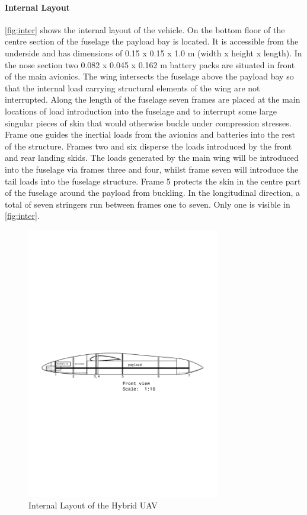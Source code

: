 \paragraph{Internal Layout}
\autoref{fig:inter} shows the internal layout of the vehicle. On the bottom floor of the centre section of the fuselage the payload bay is located. It is accessible from the underside and has dimensions of 0.15 x 0.15 x 1.0 m (width x height x length). In the nose section two 0.082 x 0.045 x 0.162 m battery packs are situated in front of the main avionics. The wing intersects the fuselage above the payload bay so that the internal load carrying structural elements of the wing are not interrupted. Along the length of the fuselage seven frames are placed at the main locations of load introduction into the fuselage and to interrupt some large singular pieces of skin that would otherwise buckle under compression stresses. Frame one guides the inertial loads from the avionics and batteries into the rest of the structure. Frames two and six disperse the loads introduced by the front and rear landing skids. The loads generated by the main wing will be introduced into the fuselage via frames three and four, whilst frame seven will introduce the tail loads into the fuselage structure. Frame 5 protects the skin in the centre part of the fuselage around the payload from buckling. In the longitudinal direction, a total of seven stringers run between frames one to seven. Only one is visible in \autoref{fig:inter}. 

\begin{figure}[H]
    \centering
    \includegraphics[width=0.75\textwidth]{Structures/Figures/Drawing2}
    \caption{Internal Layout of the Hybrid UAV}
    \label{fig:inter}
\end{figure}


